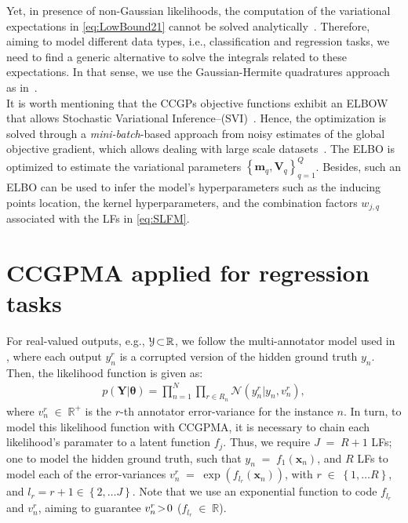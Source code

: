 \documentclass[journal]{IEEEtran}
\providecommand{\ve}[1]{{\bm{#1}}}%
\providecommand{\mat}[1]{{\bm{#1}}} %
\newcommand{\Real}{\mathbb{R}}
\DeclareMathOperator{\en}{\!\,\in\!\,}
\DeclareMathOperator{\igual}{\!\,=\!\,}
\providecommand{\s}[1]{\negthinspace#1\negthinspace}%
\providecommand{\ve}[1]{{\mathbf{#1}}}
\providecommand{\mat}[1]{{\mathbf{#1}}}
\newcommand{\gauss}{\mathcal{N}} %
\begin{document}
Yet, in presence of non-Gaussian likelihoods, the computation of the variational expectations in \cref{eq:LowBound21} cannot be solved analytically~\cite{saul2016chained,moreno2018heterogeneous}. Therefore, aiming to model different data types, i.e., classification and regression tasks, we need to find a generic alternative to solve the integrals related to these expectations. In that sense, we use the Gaussian-Hermite quadratures approach as in~\cite{hensman2015scalable,saul2016chained}.\\
It is worth mentioning that the CCGPs objective functions exhibit an ELBOW that allows Stochastic Variational Inference--(SVI)~\cite{blei2017variational}. Hence, the optimization is solved through a \textit{mini-batch}-based approach from noisy estimates of the global objective gradient, which allows dealing with large scale datasets~\cite{hensman2015scalable,saul2016chained,moreno2018heterogeneous}. The ELBO is optimized to estimate the variational parameters $\left\{\ve{m}_q, \mat{V}_q\right\}_{q=1}^{Q}$. Besides, such an ELBO can be used to infer the model's hyperparameters such as the inducing points location, the kernel hyperparameters, and the combination factors $w_{j,q}$ associated with the LFs in \cref{eq:SLFM}.


\section{CCGPMA applied for regression tasks}\label{CCGPMAReg}
For real-valued outputs, e.g., $\mathcal{Y} \s{\subset}\Real$, we follow the multi-annotator model used in \cite{raykar2010learning,groot2011learning,xiao2013learning,rodrigues2017learning}, where each output $y_n^r$ is a corrupted version of the hidden ground truth $y_n$. Then, the likelihood function is given as:
\begin{align}
\label{eq:RegLik}
p(\mat{Y}|{\bm{\theta}}) = \prod^N_{n=1}\prod_{r\in R_n}\gauss\left(y_n^r|y_n,v_{n}^r\right),
\end{align}
where $v_{n}^r\en\Real^+$ is the $r$-th annotator error-variance for the instance $n$. In turn, to model this likelihood function with CCGPMA, it is necessary to chain each likelihood's paramater to a latent function $f_j$. Thus, we require $J\igual R+1$ LFs; one to model the hidden ground truth, such that $y_n\igual f_1(\ve{x}_n)$, and $R$ LFs to model each of the error-variances $v_{n}^r\igual \exp(f_{l_r}(\ve{x}_n))$, with $r\en \left\{1, \dots R\right\}$, and $l_r = r+1 \in \left\{2, \dots J\right\}$. Note that we use an exponential function to code $f_{l_r}$ and $v_{n}^r$, aiming to guarantee $v_{n}^r\s{>}0$ ($f_{l_r}\en \Real$).
\end{document}
